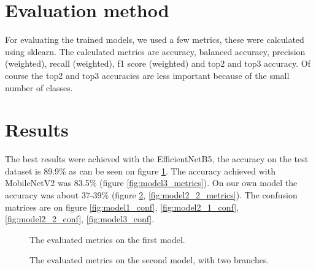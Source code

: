 \documentclass[twocolumn]{article}
\begin{document}
	\section{Evaluation method}
	For evaluating the trained models, we used a few metrics, these were calculated using sklearn. The calculated metrics are accuracy, balanced accuracy, precision (weighted), recall (weighted), f1 score (weighted) and top2 and top3 accuracy. Of course the top2 and top3 accuracies are less important because of the small number of classes.
	
	\section{Results}
	The best results were achieved with the EfficientNetB5, the accuracy on the test dataset is 89.9\% as can be seen on figure \ref{fig:model1_metrics}. The accuracy achieved with MobileNetV2 was 83.5\% (figure \ref{fig:model3_metrics}). On our own model the accuracy was about 37-39\% (figure \ref{fig:model2_1_metrics}, \ref{fig:model2_2_metrics}).
	The confusion matrices are on figure \ref{fig:model1_conf}, \ref{fig:model2_1_conf}, \ref{fig:model2_2_conf}, \ref{fig:model3_conf}.
	
	\begin{figure}[h]
		\centering
		\caption{The evaluated metrics on the first model.}
		\label{fig:model1_metrics}
	\end{figure}
	\begin{figure}[t]
		\centering
		\caption{The evaluated metrics on the second model, with two branches.}
		\label{fig:model2_1_metrics}
	\end{figure}
	
\end{document}
